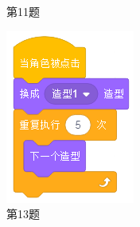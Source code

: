 \documentclass[10pt, a4paper]{article}
\begin{document}
\begin{enumerate}
\begin{figure}[htbp]
\begin{minipage}[t]{.4\textwidth}
\begin{minipage}[t]{.45\textwidth}
                \end{minipage}
                \caption*{第11题}
            \end{minipage}
            \begin{minipage}[t]{.15\textwidth}
                \centering
                \includegraphics[width=\textwidth]{13.png}
                \caption*{第13题}
            \end{minipage}
            \begin{minipage}[t]{.08\textwidth}
                \centering

\end{minipage}
\end{figure}
\end{enumerate}
\end{document}
